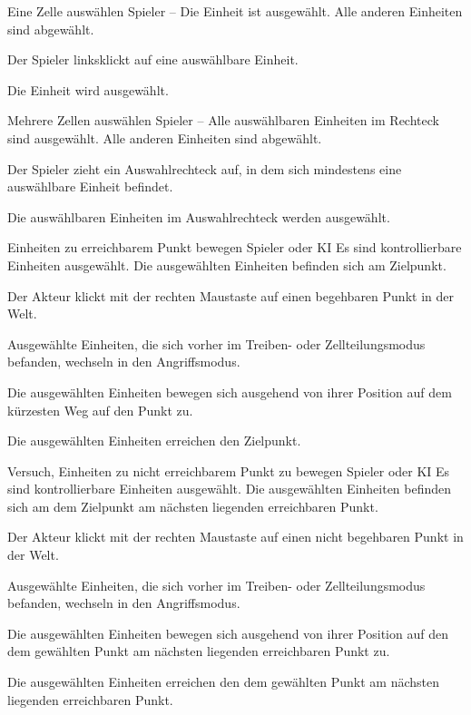 \actionentry
{Eine Zelle auswählen}
{Spieler}
{--}
{Die Einheit ist ausgewählt. Alle anderen Einheiten sind abgewählt.}
{
  \begin{compactenum}
    \item Der Spieler linksklickt auf eine auswählbare Einheit.
    \item Die Einheit wird ausgewählt.
  \end{compactenum}
}

\actionentry
{Mehrere Zellen auswählen}
{Spieler}
{--}
{
  Alle auswählbaren Einheiten im Rechteck sind ausgewählt. Alle anderen
  Einheiten sind abgewählt.
}
{
  \begin{compactenum}
    \item Der Spieler zieht ein Auswahlrechteck auf, in dem sich mindestens
      eine auswählbare Einheit befindet.
    \item Die auswählbaren Einheiten im Auswahlrechteck werden ausgewählt.
  \end{compactenum}
}

\actionentry
{Einheiten zu erreichbarem Punkt bewegen}
{Spieler oder KI}
{Es sind kontrollierbare Einheiten ausgewählt.}
{Die ausgewählten Einheiten befinden sich am Zielpunkt.}
{
  \begin{compactenum}
    \item Der Akteur klickt mit der rechten Maustaste auf einen begehbaren
      Punkt in der Welt.
    \item Ausgewählte Einheiten, die sich vorher im Treiben- oder
      Zellteilungsmodus befanden, wechseln in den Angriffsmodus.
    \item Die ausgewählten Einheiten bewegen sich ausgehend von ihrer
      Position auf dem kürzesten Weg auf den Punkt zu.
    \item Die ausgewählten Einheiten erreichen den Zielpunkt.
  \end{compactenum}
}

\actionentry
{Versuch, Einheiten zu nicht erreichbarem Punkt zu bewegen}
{Spieler oder KI}
{Es sind kontrollierbare Einheiten ausgewählt.}
{
  Die ausgewählten Einheiten befinden sich am dem Zielpunkt am nächsten
  liegenden erreichbaren Punkt.
}
{
  \begin{compactenum}
    \item Der Akteur klickt mit der rechten Maustaste auf einen nicht begehbaren
      Punkt in der Welt.
    \item Ausgewählte Einheiten, die sich vorher im Treiben- oder
      Zellteilungsmodus befanden, wechseln in den Angriffsmodus.
    \item Die ausgewählten Einheiten bewegen sich ausgehend von ihrer
      Position auf den dem gewählten Punkt am nächsten liegenden erreichbaren
      Punkt zu.
    \item Die ausgewählten Einheiten erreichen den dem gewählten Punkt am
      nächsten liegenden erreichbaren Punkt.
  \end{compactenum}
}

